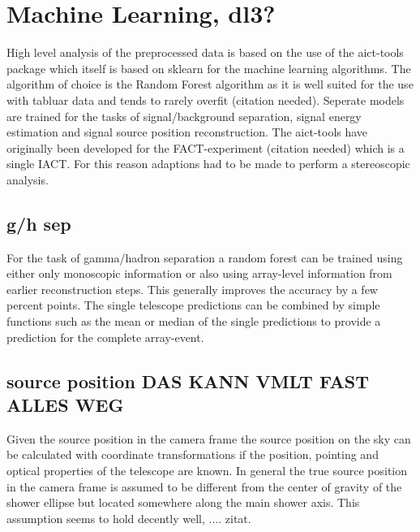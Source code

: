 \section{Machine Learning, dl3?}
High level analysis of the preprocessed data is based on the use of
the aict-tools \cite{aict-tools} package which itself is based on
sklearn \cite{sklearn_api} for the machine learning algorithms.
The algorithm of choice is the Random Forest algorithm
as it is well suited for the use with tabluar data and tends to rarely overfit
(citation needed).
Seperate models are trained for the tasks of signal/background
separation, signal energy estimation and signal source position
reconstruction.
The aict-tools have originally been developed for the FACT-experiment
(citation needed) which is a single IACT. For this reason
adaptions had to be made to perform a stereoscopic analysis.


\subsection{g/h sep}
For the task of gamma/hadron separation a random forest can be trained
using either only monoscopic information or also using array-level
information from earlier reconstruction steps.
This generally improves the accuracy by a few percent points.
The single telescope predictions can be combined by
simple functions such as the mean or median of the
single predictions to provide a prediction for the complete
array-event.




\subsection{source position DAS KANN VMLT FAST ALLES WEG}
\label{sec:source_position}
Given the source position in the camera frame the source position
on the sky can be calculated with coordinate transformations if
the position, pointing and optical properties of the
telescope are known.
In general the true source position in the camera frame is assumed to be
different from the center of gravity of the shower ellipse
but located somewhere along the main shower axis.
This assumption seems to hold decently well, .... zitat.

